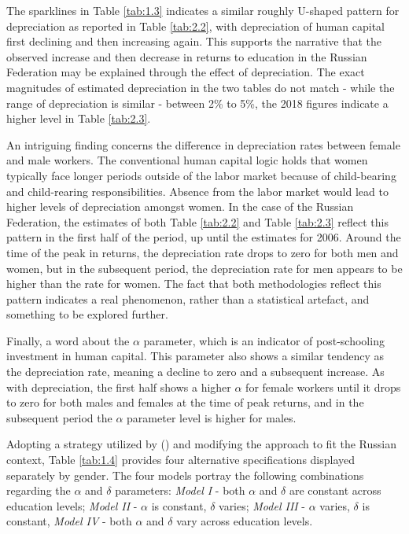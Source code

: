 \documentclass[alpha-refs]{wiley-article-02b}
\begin{document}
\setcounter{table}{3} %

The sparklines in Table \ref{tab:1.3} indicates a similar roughly U-shaped  
pattern for depreciation as reported in Table \ref{tab:2.2}, with 
depreciation of human capital first declining and then increasing again. 
This supports the narrative that the observed increase and then decrease in 
returns to education in the Russian Federation may be explained through the 
effect of depreciation. The  exact magnitudes of estimated depreciation in 
the two tables do not match - while the range of depreciation is similar - 
between 2\% to 5\%, the 2018 figures indicate a higher level in Table 
\ref{tab:2.3}. 

\vspace{3pt}

An intriguing finding concerns the difference in depreciation rates between female and male workers. The conventional human capital logic holds that women typically face longer periods outside of the labor market because of child-bearing and child-rearing responsibilities. Absence from the labor market would lead to higher levels of depreciation amongst women. In the case of the Russian Federation, the estimates of both Table \ref{tab:2.2} and Table \ref{tab:2.3} reflect this pattern in the first half of the period, up until the estimates for 2006. Around the time of the peak in returns, the depreciation rate drops to zero for both men and women, but in the subsequent period, the depreciation rate for men appears to be higher than the rate for women. The fact that both methodologies reflect this pattern indicates a real phenomenon, rather than a statistical artefact, and something to be explored further. 

\vspace{3pt}

Finally, a word about the $\alpha$ parameter, which is an indicator of post-schooling investment in human capital. This parameter also shows a similar tendency as the depreciation rate, meaning a decline to zero and a subsequent  increase. As with depreciation, the first half shows a higher $\alpha$ for female workers until it drops to zero for both males and females at the time of peak returns, and in the subsequent period the $\alpha$ parameter level is higher for males. 

\vspace{3pt}

Adopting a strategy utilized by (\citet{Weber_2008}) and modifying the approach to fit the Russian context, Table \ref{tab:1.4} provides four alternative specifications displayed separately by gender. The four models portray the following combinations regarding the $\alpha$  and $\delta$ parameters: \textit{Model I} - both $\alpha$ and $\delta$ are constant across education levels; \textit{Model II} - $\alpha$ is constant, $\delta$ varies; \textit{Model III} - $\alpha$ varies, $\delta$ is constant, \textit{Model IV} - both $\alpha$ and $\delta$ vary across education levels.
\end{document}
